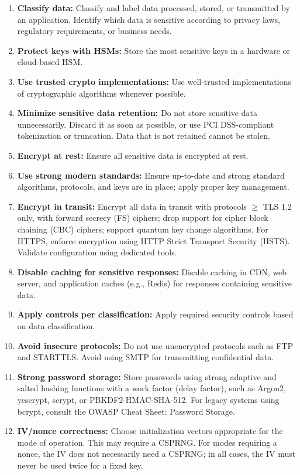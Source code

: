 \documentclass[11pt]{article}
\begin{document}
\begin{enumerate}
  \item \textbf{Classify data:} Classify and label data processed, stored, or transmitted by an application. Identify which data is sensitive according to privacy laws, regulatory requirements, or business needs.
  \item \textbf{Protect keys with HSMs:} Store the most sensitive keys in a hardware or cloud-based HSM.
  \item \textbf{Use trusted crypto implementations:} Use well-trusted implementations of cryptographic algorithms whenever possible.
  \item \textbf{Minimize sensitive data retention:} Do not store sensitive data unnecessarily. Discard it as soon as possible, or use PCI DSS-compliant tokenization or truncation. Data that is not retained cannot be stolen.
  \item \textbf{Encrypt at rest:} Ensure all sensitive data is encrypted at rest.
  \item \textbf{Use strong modern standards:} Ensure up-to-date and strong standard algorithms, protocols, and keys are in place; apply proper key management.
  \item \textbf{Encrypt in transit:} Encrypt all data in transit with protocols \(\geq\) TLS 1.2 only, with forward secrecy (FS) ciphers; drop support for cipher block chaining (CBC) ciphers; support quantum key change algorithms. For HTTPS, enforce encryption using HTTP Strict Transport Security (HSTS). Validate configuration using dedicated tools.
  \item \textbf{Disable caching for sensitive responses:} Disable caching in CDN, web server, and application caches (e.g., Redis) for responses containing sensitive data.
  \item \textbf{Apply controls per classification:} Apply required security controls based on data classification.
  \item \textbf{Avoid insecure protocols:} Do not use unencrypted protocols such as FTP and STARTTLS. Avoid using SMTP for transmitting confidential data.
  \item \textbf{Strong password storage:} Store passwords using strong adaptive and salted hashing functions with a work factor (delay factor), such as Argon2, yescrypt, scrypt, or PBKDF2-HMAC-SHA-512. For legacy systems using bcrypt, consult the OWASP Cheat Sheet: Password Storage.
  \item \textbf{IV/nonce correctness:} Choose initialization vectors appropriate for the mode of operation. This may require a CSPRNG. For modes requiring a nonce, the IV does not necessarily need a CSPRNG; in all cases, the IV must never be used twice for a fixed key.

\end{enumerate}
\end{document}
